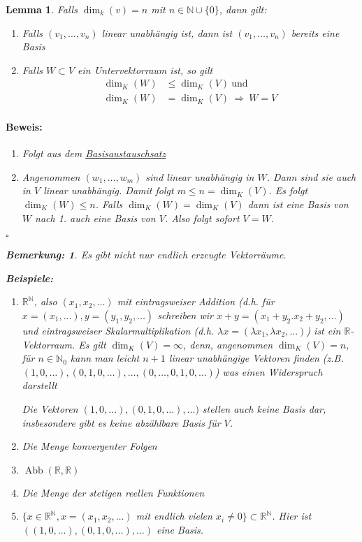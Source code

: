 \documentclass{report}
\newcommand{\lb}{\lambda}
\newcommand{\R}{\mathbb{R}}
\newcommand{\N}{\mathbb{N}}
\newcommand{\mR}{$\mathbb{R}$}
\DeclareMathOperator{\abb}{Abb}
\theoremstyle{customrem}
\newtheorem*{bem}{Bemerkung\textnormal:}
\theoremstyle{customdef}
\newtheorem{lemma}[definition]{Lemma}
\renewenvironment{proof}{\vspace{-.75cm}\paragraph{Beweis: }}{\vspace{-.5cm}\hfill$\square$}
\begin{document}
	\begin{lemma}
		Falls $\dim_k(v) = n$ mit $n \in \N \cup \{0\}$, dann gilt:
		\begin{enumerate}
			\item Falls $(v_1, \dots, v_n)$ linear unabhängig ist, dann ist $(v_1, \ldots, v_n)$ bereits eine Basis
			\item Falls $W \subset V$ ein Untervektorraum ist, so gilt
			\begin{align*}
				\dim_K(W) &\le \dim_K(V)\ \text{und}\\
				\dim_K(W) &= \dim_K(V)\ \Rightarrow \ W = V
			\end{align*}
		\end{enumerate}
		\vspace{.2cm}
		\begin{proof}
			\begin{enumerate}
				\item Folgt aus dem \hyperref[satz215]{Basisaustauschsatz}
				\item Angenommen $(w_1, \dots, w_m)$ sind linear unabhängig in $W$. Dann sind sie auch in $V$ linear unabhängig. Damit folgt $m \leq n = \dim_K(V)$. Es folgt $\dim_K(W) \leq n$. Falls $\dim_K(W) = \dim_K(V)$ dann ist eine Basis von $W$ nach 1. auch eine Basis von $V$. Also folgt sofort $V = W$.
			\end{enumerate}
		\end{proof}
		\begin{bem}
			Es gibt nicht nur endlich erzeugte Vektorräume.\\
		\end{bem}
		\begin{minipage}{\textwidth}
			\textbf{Beispiele: }
			\begin{enumerate}
				\item $\R^\N$, also $(x_1, x_2, \ldots)$ mit eintragsweiser Addition (d.h. für $x = (x_1, \ldots), y = (y_1, y_2, \ldots)$ schreiben wir $x + y = (x_1 + y_2. x_2 + y_2, \ldots)$ und eintragsweiser Skalarmultiplikation (d.h. $\lb x = (\lb x_1, \lb x_2, \ldots)$) ist ein \mR -Vektorraum. Es gilt $\dim_K(V) = \infty$, denn, angenommen $\dim_K(V) = n$, für $n \in \N_0$ kann man leicht $n + 1$ linear unabhängige Vektoren finden (z.B. $(1, 0, \ldots), (0, 1, 0, \ldots), \dots, (0, \ldots, 0, 1, 0, \ldots)$) was einen Widerspruch darstellt \Lightning
				
				Die Vektoren $(1, 0, \dots), (0, 1, 0, \dots), \dots)$ stellen auch keine Basis dar, insbesondere gibt es keine abzählbare Basis für $V$.
				\item Die Menge konvergenter Folgen
				\item $\abb(\R, \R)$
				\item Die Menge der stetigen reellen Funktionen
				\item  $\{x \in \R^\N, x = (x_1, x_2, \dots)$ mit endlich vielen $x_i \neq 0\} \subset \R^\N$. Hier ist $((1, 0, \dots), (0, 1, 0, \dots), \dots)$ eine Basis.
			\end{enumerate}
		\end{minipage}

	\end{lemma}
\end{document}
